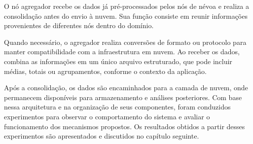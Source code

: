 O nó agregador recebe os dados já pré-processados pelos nós de névoa e
realiza a consolidação antes do envio à nuvem. Sua função consiste em reunir
informações provenientes de diferentes nós dentro do domínio.

Quando necessário, o agregador realiza conversões de formato ou protocolo
para manter compatibilidade com a infraestrutura em nuvem. Ao receber os dados,
combina as informações em um único arquivo estruturado, que pode incluir
médias, totais ou agrupamentos, conforme o contexto da aplicação.

Após a consolidação, os dados são encaminhados para a camada de nuvem, onde permanecem disponíveis para 
armazenamento e análises posteriores. Com base nessa arquitetura e na organização de seus componentes, foram conduzidos 
experimentos para observar o comportamento do sistema e avaliar o funcionamento 
dos mecanismos propostos. Os resultados obtidos a partir desses experimentos são apresentados e discutidos no capítulo seguinte.
